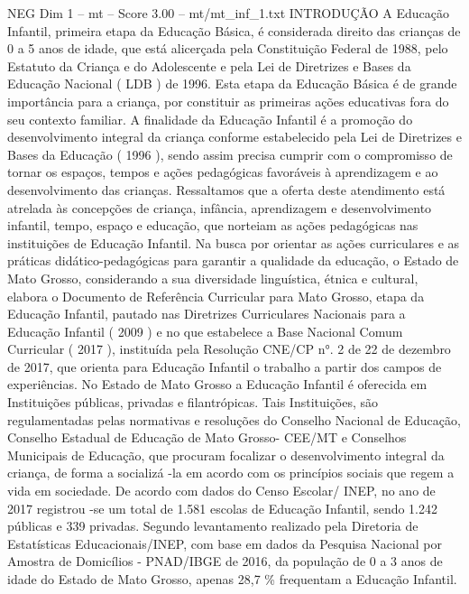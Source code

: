 \begin{textsample}{NEG Dim 1 – mt – Score 3.00 – mt/mt\_inf\_1.txt}  \label{ex:f1_neg_215}
INTRODUÇÃO A Educação Infantil, primeira etapa da Educação Básica, é considerada direito das crianças de 0 a 5 anos de idade, que está alicerçada pela Constituição Federal de 1988, pelo Estatuto da Criança e do Adolescente e pela Lei de Diretrizes e Bases da Educação Nacional ( LDB ) de 1996.
Esta etapa da Educação Básica é de grande importância para a criança, por constituir as primeiras ações educativas fora do seu contexto familiar.
A finalidade da Educação Infantil é a promoção do desenvolvimento integral da criança conforme estabelecido pela Lei de Diretrizes e Bases da Educação ( 1996 ), sendo assim precisa cumprir com o compromisso de tornar os espaços, tempos e ações pedagógicas favoráveis à aprendizagem e ao desenvolvimento das crianças.
Ressaltamos que a oferta deste atendimento está atrelada às concepções de criança, infância, aprendizagem e desenvolvimento infantil, tempo, espaço e educação, que norteiam as ações pedagógicas nas instituições de Educação Infantil.
Na busca por orientar as ações curriculares e as práticas didático-pedagógicas para garantir a qualidade da educação, o Estado de Mato Grosso, considerando a sua diversidade linguística, étnica e cultural, elabora o Documento de Referência Curricular para Mato Grosso, etapa da Educação Infantil, pautado nas Diretrizes Curriculares Nacionais para a Educação Infantil ( 2009 ) e no que estabelece a Base Nacional Comum Curricular ( 2017 ), instituída pela Resolução CNE/CP n{\EmojiFont °}. 2 de 22 de dezembro de 2017, que orienta para Educação Infantil o trabalho a partir dos campos de experiências.
No Estado de Mato Grosso a Educação Infantil é oferecida em Instituições públicas, privadas e filantrópicas.
Tais Instituições, são regulamentadas pelas normativas e resoluções do Conselho Nacional de Educação, Conselho Estadual de Educação de Mato Grosso- CEE/MT e Conselhos Municipais de Educação, que procuram focalizar o desenvolvimento integral da criança, de forma a socializá -la em acordo com os princípios sociais que regem a vida em sociedade.
De acordo com dados do Censo Escolar/ INEP, no ano de 2017 registrou -se um total de 1.581 escolas de Educação Infantil, sendo 1.242 públicas e 339 privadas.
Segundo levantamento realizado pela Diretoria de Estatísticas Educacionais/INEP, com base em dados da Pesquisa Nacional por Amostra de Domicílios - PNAD/IBGE de 2016, da população de 0 a 3 anos de idade do Estado de Mato Grosso, apenas 28,7 \% frequentam a Educação Infantil.

\end{textsample}
